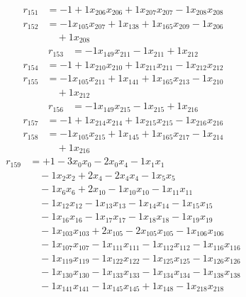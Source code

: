 \[\begin{aligned}
r_{151} &= - 1 + 1 x_{206} x_{206} + 1 x_{207} x_{207} - 1 x_{208} x_{208}
\end{aligned}\]
\[\begin{aligned}
r_{152} &= - 1 x_{105} x_{207} + 1 x_{138} + 1 x_{165} x_{209} - 1 x_{206} \\
 &\quad + 1 x_{208}
\end{aligned}\]
\[\begin{aligned}
r_{153} &= - 1 x_{149} x_{211} - 1 x_{211} + 1 x_{212}
\end{aligned}\]
\[\begin{aligned}
r_{154} &= - 1 + 1 x_{210} x_{210} + 1 x_{211} x_{211} - 1 x_{212} x_{212}
\end{aligned}\]
\[\begin{aligned}
r_{155} &= - 1 x_{105} x_{211} + 1 x_{141} + 1 x_{165} x_{213} - 1 x_{210} \\
 &\quad + 1 x_{212}
\end{aligned}\]
\[\begin{aligned}
r_{156} &= - 1 x_{149} x_{215} - 1 x_{215} + 1 x_{216}
\end{aligned}\]
\[\begin{aligned}
r_{157} &= - 1 + 1 x_{214} x_{214} + 1 x_{215} x_{215} - 1 x_{216} x_{216}
\end{aligned}\]
\[\begin{aligned}
r_{158} &= - 1 x_{105} x_{215} + 1 x_{145} + 1 x_{165} x_{217} - 1 x_{214} \\
 &\quad + 1 x_{216}
\end{aligned}\]
\[\begin{aligned}
r_{159} &= + 1 - 3 x_{0} x_{0} - 2 x_{0} x_{4} - 1 x_{1} x_{1} \\
 &\quad - 1 x_{2} x_{2} + 2 x_{4} - 2 x_{4} x_{4} - 1 x_{5} x_{5} \\
 &\quad - 1 x_{6} x_{6} + 2 x_{10} - 1 x_{10} x_{10} - 1 x_{11} x_{11} \\
 &\quad - 1 x_{12} x_{12} - 1 x_{13} x_{13} - 1 x_{14} x_{14} - 1 x_{15} x_{15} \\
 &\quad - 1 x_{16} x_{16} - 1 x_{17} x_{17} - 1 x_{18} x_{18} - 1 x_{19} x_{19} \\
 &\quad - 1 x_{103} x_{103} + 2 x_{105} - 2 x_{105} x_{105} - 1 x_{106} x_{106} \\
 &\quad - 1 x_{107} x_{107} - 1 x_{111} x_{111} - 1 x_{112} x_{112} - 1 x_{116} x_{116} \\
 &\quad - 1 x_{119} x_{119} - 1 x_{122} x_{122} - 1 x_{125} x_{125} - 1 x_{126} x_{126} \\
 &\quad - 1 x_{130} x_{130} - 1 x_{133} x_{133} - 1 x_{134} x_{134} - 1 x_{138} x_{138} \\
 &\quad - 1 x_{141} x_{141} - 1 x_{145} x_{145} + 1 x_{148} - 1 x_{218} x_{218}
\end{aligned}\]
